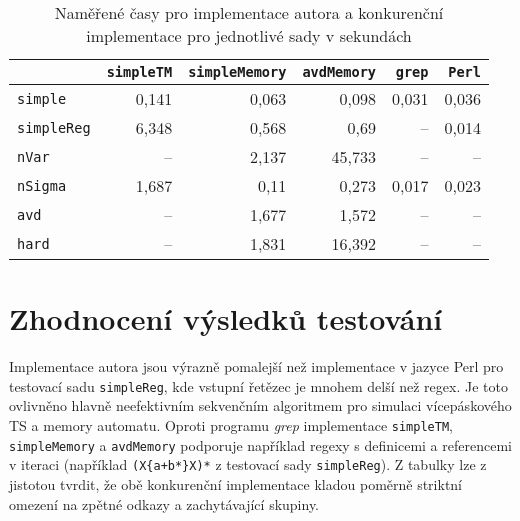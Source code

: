 \documentclass[thesis=B,czech]{FITthesis}[2019/12/23]
\theoremstyle{definition}
\begin{document}
\begin{table}
\begin{center}
\begin{tabular}{l||r|r|r|r|r}
 & 		\texttt{simpleTM}		 & \texttt{simpleMemory}   & 	\texttt{avdMemory}			&   	\texttt{grep}		      & \texttt{Perl} \\ \hline \hline
 \texttt{simple} &               0,141      & 0,063  &   0,098                 &       0,031              &  0,036  \\ \hline
 \texttt{simpleReg} &           6,348      &  0,568 &  0,69                  &   --\footnote[1]              & 0,014  \\ \hline
 \texttt{nVar} &             --\footnote[7]          &   2,137    &      45,733          &                --\footnotemark[1]      &  --\footnotemark[1]\\ \hline
 \texttt{nSigma}&            1,687           & 0,11     &        0,273       &             0,017         &   0,023\\ \hline
 \texttt{avd}& --\footnotemark[7] & 1,677 & 1,572 & --\footnotemark[1] & --\footnotemark[1] \\ \hline
\texttt{hard}&             --\footnotemark[7]      & 1,831 &          16,392         &                --\footnotemark[1]     &  --\footnotemark[1] \\ \hline
\end{tabular}
\end{center}
\caption{\label{tab:time} Naměřené časy pro implementace autora a konkurenční implementace pro jednotlivé sady v sekundách}
\end{table}

\section{Zhodnocení výsledků testování}
Implementace autora jsou výrazně pomalejší než implementace v jazyce Perl pro testovací sadu \texttt{simpleReg}, kde vstupní řetězec je mnohem delší než regex. Je toto ovlivněno hlavně neefektivním sekvenčním algoritmem pro simulaci vícepáskového TS a memory automatu. Oproti programu \emph{grep} implementace \texttt{simpleTM}, \texttt{simpleMemory} a \texttt{avdMemory} podporuje například regexy s definicemi a referencemi v iteraci (například \texttt{(X\{a+b*\}X)*} z testovací sady \texttt{simpleReg}). Z tabulky lze z jistotou tvrdit, že obě konkurenční implementace kladou poměrně striktní omezení na zpětné odkazy a zachytávající skupiny.
\end{document}
